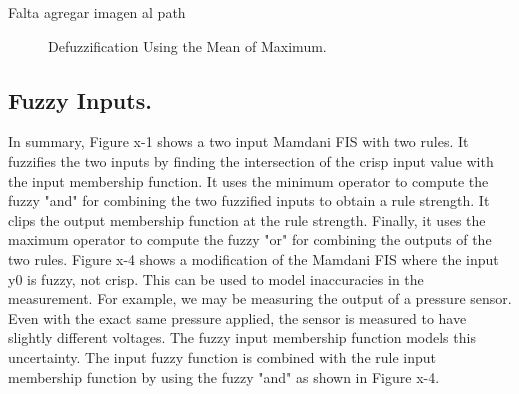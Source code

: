 \begin{enumerate}
Falta agregar imagen al path
\begin{figure}
\captionsetup{justification=centering,margin=2cm}
\centering
\setlength\fboxsep{0pt}
\setlength\fboxrule{0.7pt}
\caption{Defuzzification Using the Mean of Maximum.}
\label{fig:mean}       
\end{figure}

\end{enumerate}

\subsection{Fuzzy Inputs.}  
In summary, Figure x-1 shows a two input Mamdani FIS
with two rules. It fuzzifies the two inputs by finding the intersection of the
crisp input value with the input membership function. It uses the minimum
operator to compute the fuzzy "and" for combining the two fuzzified inputs to
obtain a rule strength. It clips the output membership function at the rule
strength. Finally, it uses the maximum operator to compute the fuzzy "or" for
combining the outputs of the two rules. Figure x-4 shows a modification of the
Mamdani FIS where the input y0 is fuzzy, not crisp. This can be used to model
inaccuracies in the measurement. For example, we may be measuring the output of
a pressure sensor. Even with the exact same pressure applied, the sensor is
measured to have slightly different voltages. The fuzzy input membership
function models this uncertainty. The input fuzzy function is combined with the
rule input membership function by using the fuzzy "and" as shown in Figure x-4.


